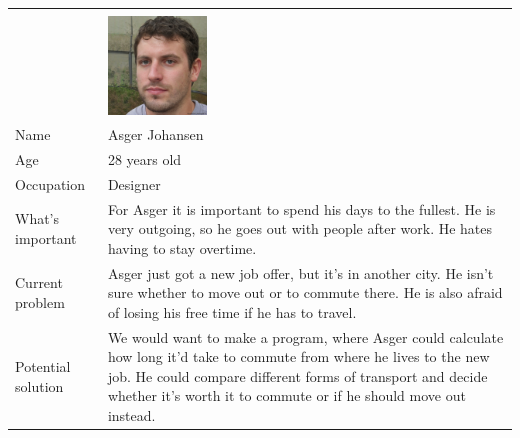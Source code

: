 \begin{tabularx}{\textwidth}{ | l X | }
    \hline
    &                                                      \\
    & \includegraphics[width=0.25\textwidth]{images/asger} \\
    Name       & Asger Johansen                                       \\
    Age        & 28 years old                                         \\
    Occupation & Designer                                             \\
    What's important & For Asger it is important to spend his days to the fullest.
    He is very outgoing, so he goes out with people after work.
    He hates having to stay overtime. \\
    Current problem & Asger just got a new job offer, but it's in another city.
    He isn't sure whether to move out or to commute there.
    He is also afraid of losing his free time if he has to travel. \\
    Potential solution & We would want to make a program, where Asger could calculate how long it'd take to commute from
    where he lives to the new job.
    He could compare different forms of transport and decide whether it's worth it to commute or if he should move out
    instead. \\
    \hline
\end{tabularx}

